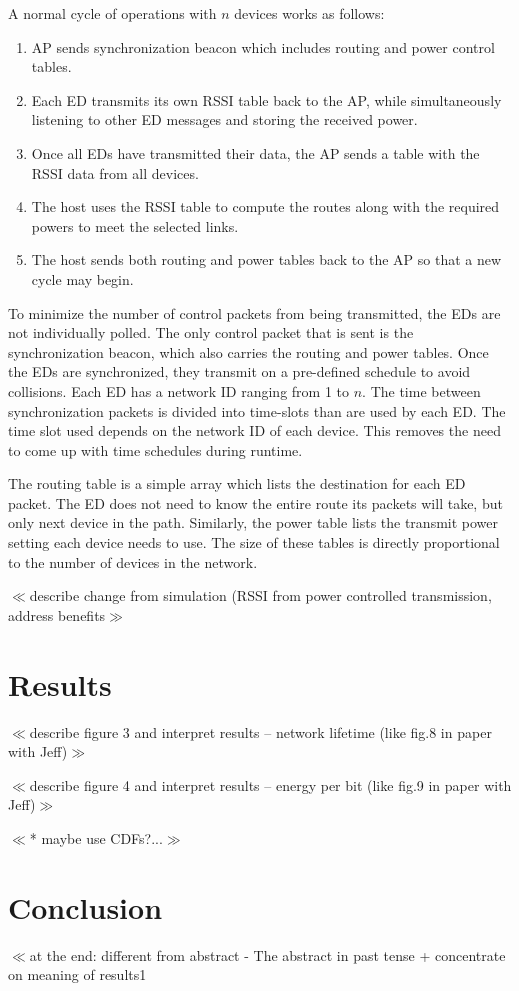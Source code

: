 \documentclass{article}
\begin{document}
A normal cycle of operations with $n$ devices works as follows:
\begin{enumerate}
\item AP sends synchronization beacon which includes routing and power control tables.
\item Each ED transmits its own RSSI table back to the AP, while simultaneously listening to other ED messages and storing the received power.
\item Once all EDs have transmitted their data, the AP sends a table with the RSSI data from all devices.
\item The host uses the RSSI table to compute the routes along with the required powers to meet the selected links.
\item The host sends both routing and power tables back to the AP so that a new cycle may begin.
\end{enumerate}

To minimize the number of control packets from being transmitted, the EDs are not individually polled. The only control packet that is sent is the synchronization beacon, which also carries the routing and power tables. Once the EDs are synchronized, they transmit on a pre-defined schedule to avoid collisions. Each ED has a network ID ranging from 1 to $n$. The time between synchronization packets is divided into time-slots than are used by each ED. The time slot used depends on the network ID of each device. This removes the need to come up with time schedules during runtime.

The routing table is a simple array which lists the destination for each ED packet. The ED does not need to know the entire route its packets will take, but only next device in the path. Similarly, the power table lists the transmit power setting each device needs to use. The size of these tables is directly proportional to the number of devices in the network.

$\ll$describe change from simulation (RSSI from power controlled transmission, address benefits$\gg$

\section{Results}

$\ll$describe figure  3 and interpret results – network lifetime (like fig.8 in paper with Jeff)$\gg$ 

$\ll$describe figure  4 and interpret results – energy per bit (like fig.9 in paper with Jeff)$\gg$ 

$\ll$* maybe use CDFs?...$\gg$

\section{Conclusion}
$\ll$at the end: different from abstract -  The abstract in past tense + concentrate on meaning of results1

{}

\end{document}

